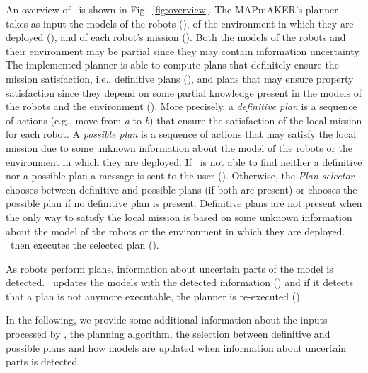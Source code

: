 
An overview of \toolName\ is shown in Fig.~\ref{fig:overview}.
The MAPmAKER's planner takes as input the models of the robots (), of the environment in which they are deployed (), and of each robot's mission ().
Both the models of the robots and their environment may be partial since they may contain information uncertainty.
The implemented planner is able to compute plans that definitely ensure the mission satisfaction, i.e., definitive plans  (), and plans that may ensure property satisfaction since they depend on some partial knowledge present in the models of the robots and the environment  ().
More precisely, a \emph{definitive plan} is a sequence of actions (e.g., move from \emph{a} to \emph{b}) that ensure the satisfaction of the local mission for each robot. 
A \emph{possible plan} is a sequence of actions that may satisfy the local mission due to some unknown information about the model of the robots or the environment in which they are deployed. 
If \toolName\ is not able to find neither a definitive nor a possible plan a message is sent to the user ().
Otherwise, the \emph{Plan selector} chooses between definitive and possible plans (if both are present) or chooses the possible plan if no definitive plan is present.
Definitive plans are not present when the only way to satisfy the local mission is based on some unknown information about the model of the robots or the environment in which they are deployed. 
\toolName\ then executes the selected plan ().

As robots perform plans, information about uncertain parts of the model is detected.
\toolName\ updates the  models with the detected information () and if it detects that a plan is not anymore executable, the planner is re-executed ().


In the following, we provide some additional information about the inputs processed  by \toolName, the planning algorithm, the selection between definitive and possible plans and how models are updated when information about uncertain parts is detected.


